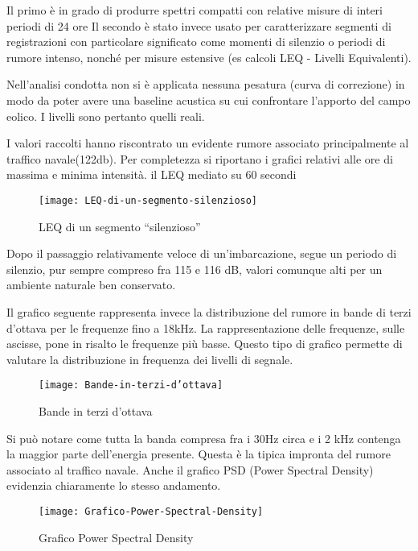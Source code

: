 Il primo è in grado di produrre spettri compatti con relative misure di interi periodi di 24 ore
Il secondo è stato invece usato per caratterizzare segmenti di registrazioni con particolare significato come momenti di silenzio o periodi di rumore intenso, nonché per misure estensive (es calcoli LEQ - Livelli Equivalenti).

Nell’analisi condotta non si è applicata nessuna pesatura (curva di correzione) in modo da poter avere una baseline acustica su cui confrontare l’apporto del campo eolico. 
I livelli sono pertanto quelli reali.

I valori raccolti hanno riscontrato un evidente rumore associato principalmente al traffico navale(122db). 
Per completezza si riportano i grafici relativi alle ore di massima e minima intensità. il LEQ mediato su 60 secondi 

\begin{figure}[h]
\centering
\texttt{[image: LEQ-di-un-segmento-silenzioso]}
\caption{LEQ di un segmento “silenzioso”}
\end{figure}

Dopo il passaggio relativamente veloce di un’imbarcazione, segue un periodo di silenzio, pur sempre compreso fra 115 e 116 dB, valori comunque alti per un ambiente naturale ben conservato.

Il grafico seguente rappresenta invece la distribuzione del rumore in bande di terzi d’ottava per le frequenze fino a 18kHz. 
La rappresentazione delle frequenze, sulle ascisse, pone in risalto le frequenze più basse. 
Questo tipo di grafico permette di valutare la distribuzione in frequenza dei livelli di segnale.

\begin{figure}[h]
\centering
\texttt{[image: Bande-in-terzi-d'ottava]}
\caption{Bande in terzi d’ottava}
\end{figure}

Si può notare come tutta la banda compresa fra i 30Hz circa e i 2 kHz contenga la maggior parte dell’energia presente. 
Questa è la tipica impronta del rumore associato al traffico navale. 
Anche il grafico PSD (Power Spectral Density) evidenzia chiaramente lo stesso andamento.

\begin{figure}[h]
\centering
\texttt{[image: Grafico-Power-Spectral-Density]}
\caption{Grafico Power Spectral Density}
\end{figure}

